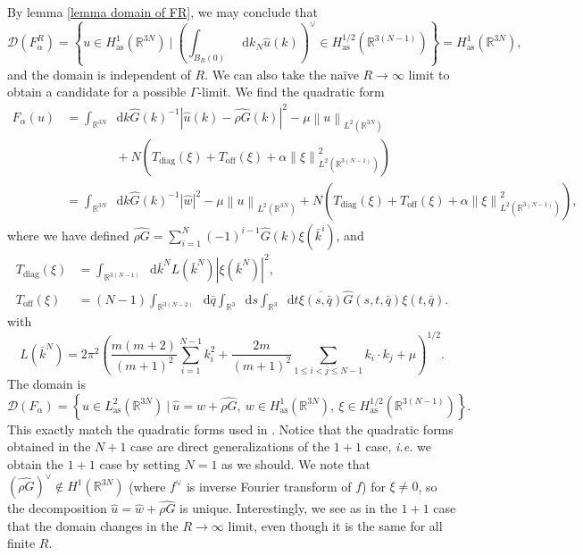 \documentclass[a4paper,11pt]{article}
\newcommand{\norm}[1]{\left\lVert #1 \right\rVert}
\newcommand{\abs}[1]{\left\lvert #1 \right\rvert}
\newcommand*\diff{\mathop{}\!\mathrm{d}}
\newcommand{\ie}{\emph{i.e.} }
\newcommand{\R}{\mathbb{R}}
\numberwithin{equation}{section}
\begin{document}
By lemma \ref{lemma domain of FR}, we may conclude that \begin{equation}
\mathscr{D}(F_\alpha^R)=\left\{u\in H_{\text{as}}^1(\R^{3N})\ \Big\vert\ \left(\int_{B_R(0)}\diff k_N \hat{u}(k)\right)^\vee\in H_{\text{as}}^{1/2}\left(\R^{3(N-1)}\right)\right\}=H^1_{\text{as}}(\R^{3N}),
\end{equation}
and the domain is independent of $ R $.
We can also take the na\"ive $ R\to\infty $ limit to obtain a candidate for a possible $ \Gamma $-limit. We find the quadratic form\begin{equation}
\begin{aligned}
F_\alpha(u)&=\int_{\R^{3N}}\diff k \hat{G}(k)^{-1}|\hat{u}(k)-\widehat{\rho G}(k)|^2-\mu\norm{u}_{L^2(\R^{3N})}\\ &\qquad \qquad+N\left(T_{\text{diag}}(\xi)+T_{\text{off}}(\xi)+\alpha\norm{\xi}_{L^2(\R^{3(N-1)})}^2\right)\\
&=\int_{\R^{3N}}\diff k \hat{G}(k)^{-1}|\hat{w}|^2-\mu\norm{u}_{L^2(\R^{3N})}+N\left(T_{\text{diag}}(\xi)+T_{\text{off}}(\xi)+\alpha\norm{\xi}_{L^2(\R^{3(N-1)})}^2\right),
\end{aligned}
\end{equation}
where we have defined $ \widehat{\rho G}=\sum_{i=1}^{N}(-1)^{i-1}\hat{G}(k)\xi(\bar{k}^i) $, and \begin{equation}
\begin{aligned}
T_{\text{diag}}(\xi)&=\int_{\R^{3(N-1)}}\diff \bar{k}^N L(\bar{k}^N) \abs{\xi(\bar{k}^N)}^2,\\
T_{\text{off}}(\xi)&=(N-1)\int_{\R^{3(N-2)}}\diff \bar{q}\int_{\R^3}\diff s\int_{\R^3}\diff t \overline{\xi(s,\bar{q})}\hat{G}(s,t,\bar{q})\xi(t,\bar{q}).
\end{aligned}
\end{equation} 
with \begin{equation}
L(\bar{k}^N)=2\pi^2\left(\frac{m(m+2)}{(m+1)^2}\sum_{i=1}^{N-1}k_i^2+\frac{2m}{(m+1)^2}\sum_{1\leq i<j\leq N-1}k_i\cdot k_j+\mu\right)^{1/2}.
\end{equation}
The domain is \begin{equation}
\mathscr{D}(F_\alpha)=\left\{u\in L_{\text{as}}^2(\R^{3N})\ \Big\vert\ \hat{u}=\hat{w}+\widehat{\rho G},\ w\in H_{\text{as}}^1(\R^{3N}),\ \xi\in H_{\text{as}}^{1/2}(\R^{3(N-1)}) \right\}.
\end{equation}
This exactly match the quadratic forms used in \cite{FINCO2012131,Moser_2017}. Notice that the quadratic forms obtained in the $ N+1 $ case are direct generalizations of the $ 1+1 $ case, \ie we obtain the $ 1+1 $ case by setting $ N=1 $ as we should. We note that $ (\widehat{\rho G})^\vee\notin H^1(\R^{3N}) $ (where $ f^\vee $ is inverse Fourier transform of $ f $) for $ \xi\neq0 $, so the decomposition $ \hat{u}=\hat{w}+\widehat{\rho G} $ is unique. Interestingly, we see as in the $ 1+1 $ case that the domain changes in the $ R\to\infty $ limit, even though it is the same for all finite $ R $.\\
\end{document}
